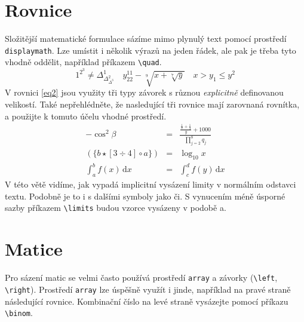 \documentclass[a4paper,twocolumn,11pt]{article}[06-03-2022]
\theoremstyle{definition}
\begin{document}
\section{Rovnice}
Složitější matematické formulace sázíme mimo plynulý text pomocí prostředí \texttt{displaymath}.
Lze umístit i několik výrazů na jeden řádek, ale pak je třeba tyto vhodně oddělit, například příkazem \verb|\quad|.
\begin{displaymath}
    1^{2^3} \neq \Delta^1_{\Delta^2_{\Delta^3}}
    \quad
    y^{11}_{22} - \sqrt[9]{x + \sqrt[7]{y}}
    \quad
    x > y_1 \leq y^2
\end{displaymath}
V rovnici \eqref{eq2} jsou využity tři typy závorek s různou \textit{explicitně} definovanou velikostí.
Také nepřehlédněte, že nasledující tři rovnice mají zarovnaná rovnítka, a použijte k tomuto účelu vhodné prostředí.
\begin{eqnarray}
    \label{eq1}
    - \cos^2 \beta & = & \frac{\frac{\frac{1}{x} + \frac{1}{3}}{y} + 1000}{\prod\limits^8_{j=2} q_j} \\
    \label{eq2}
    (\{ b \star [3 \div 4] \circ a \})& = & \log_{10} x \\
    \label{eq3}
    \int^b_a f(x)\,\mathrm{d}x & = & \int^d_c f(y)\,\mathrm{d}x
\end{eqnarray}
V této větě vidíme, jak vypadá implicitní vysázení limity v normálním odstavci textu. Podobně je to i s dalšími symboly jako či.
S vynucením méně úsporné sazby příkazem \verb|\limits| budou vzorce vysázeny v podobě a.

\section{Matice}
Pro sázení matic se velmi často používá prostředí \texttt{array} a závorky (\verb|\left|, \verb|\right|). 
Prostředí \texttt{array} lze úspěšně využít i jinde, například na pravé straně následující rovnice. 
Kombinační číslo na levé straně vysázejte pomocí příkazu \verb|\binom|.
\end{document}
